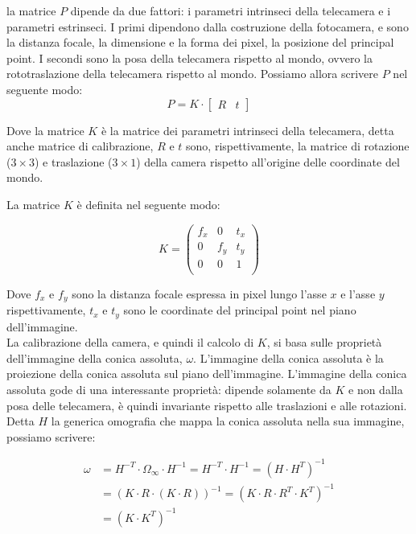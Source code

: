 la matrice $P$ dipende da due fattori: i parametri intrinseci della telecamera e i parametri estrinseci.
I primi dipendono dalla costruzione della fotocamera, e sono la distanza focale, la dimensione e la forma dei pixel, la posizione del principal point. I secondi sono la posa della telecamera rispetto al mondo, ovvero la rototraslazione della telecamera rispetto al mondo.  
Possiamo allora scrivere $P$ nel seguente modo:
\begin{equation*}
 P = K \cdot \left[
    \begin{array}{c|c}
      R & t
    \end{array} 
\right]
\end{equation*}

Dove la matrice $K$ è la matrice dei parametri intrinseci della telecamera, detta anche matrice di calibrazione, $R$ e $t$ sono, rispettivamente, la matrice di rotazione ($3\times3$) e traslazione ($3\times1$) della camera rispetto all'origine delle coordinate del mondo.

La matrice $K$ è definita nel seguente modo:

\begin{equation*}
 K = \begin{pmatrix} f_x & 0 & t_x \\ 0 & f_y & t_y \\ 0 & 0 & 1 \\ \end{pmatrix} 
\end{equation*}

Dove $f_x$ e $f_y$ sono la distanza focale espressa in pixel lungo l'asse $x$ e l'asse $y$ rispettivamente, $t_x$ e $t_y$ sono le coordinate del principal point nel piano dell'immagine. \\

La calibrazione della camera, e quindi il calcolo di $K$, si basa sulle proprietà dell'immagine della conica assoluta, $\omega$.
L'immagine della conica assoluta è la proiezione della conica assoluta sul piano dell'immagine. L'immagine della conica assoluta gode di una interessante proprietà: dipende solamente da $K$ e non dalla posa delle telecamera, è quindi invariante rispetto alle traslazioni e alle rotazioni. Detta $H$ la generica omografia che mappa la conica assoluta nella sua immagine, possiamo scrivere:

\begin{equation*}
 \begin{split}
  \omega &= H^{-T}\cdot\Omega_\infty\cdot H^{-1} = H^{-T}\cdot H^{-1} = \left( H\cdot H^T \right)^{-1} \\
         &= \left( K\cdot R\cdot \left( K\cdot R \right)\right)^{-1} =  \left( K\cdot R\cdot R^T \cdot K^T \right)^{-1} \\
         &= \left( K\cdot K^T \right)^{-1}
 \end{split}
\end{equation*}

